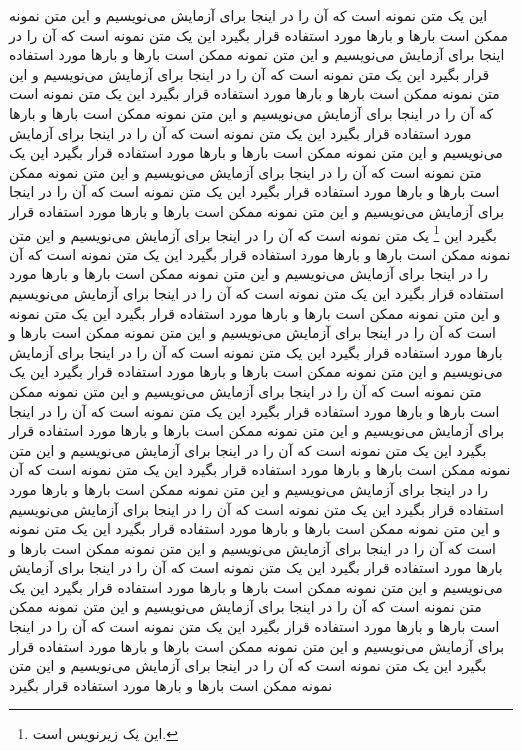\documentclass{article}
\begin{document}
\begin{multicols}{4}
این یک متن نمونه است که آن را در اینجا برای آزمایش می‌نویسیم و این متن نمونه ممکن است بارها و بارها مورد استفاده قرار بگیرد این یک متن نمونه است که آن را در اینجا برای آزمایش می‌نویسیم و این متن نمونه ممکن است %
%
بارها و بارها مورد استفاده قرار بگیرد این یک متن نمونه است که آن را در اینجا برای آزمایش می‌نویسیم و این متن نمونه ممکن است بارها و بارها مورد استفاده قرار بگیرد این یک متن نمونه است که آن را در اینجا برای آزمایش می‌نویسیم و این متن نمونه ممکن است بارها و بارها مورد استفاده قرار بگیرد این یک متن نمونه است که آن را در اینجا برای آزمایش می‌نویسیم و این متن نمونه ممکن است بارها و بارها مورد استفاده قرار بگیرد این یک متن نمونه است که آن را در اینجا برای آزمایش می‌نویسیم و این متن نمونه ممکن است بارها و بارها مورد استفاده قرار بگیرد این یک متن نمونه است که آن را در اینجا برای آزمایش می‌نویسیم و این متن نمونه ممکن است بارها و بارها مورد استفاده قرار بگیرد این%
\footnote{این یک زیرنویس است.}%
 یک متن نمونه است که آن را در اینجا برای آزمایش می‌نویسیم و این متن نمونه ممکن است بارها و بارها مورد استفاده قرار بگیرد این یک متن نمونه است که آن را در اینجا برای آزمایش می‌نویسیم و این متن نمونه ممکن است بارها و بارها مورد استفاده قرار بگیرد این یک متن نمونه است که آن را در اینجا برای آزمایش می‌نویسیم و این متن نمونه ممکن است بارها و بارها مورد استفاده قرار بگیرد این یک متن نمونه است که آن را در اینجا برای آزمایش می‌نویسیم و این متن نمونه ممکن است بارها و بارها مورد استفاده قرار بگیرد این یک متن نمونه است که آن را در اینجا برای آزمایش می‌نویسیم و این متن نمونه ممکن است بارها و بارها مورد استفاده قرار بگیرد این یک متن نمونه است که آن را در اینجا برای آزمایش می‌نویسیم و این متن نمونه ممکن است بارها و بارها مورد استفاده قرار بگیرد این یک متن نمونه است که آن را در اینجا برای آزمایش می‌نویسیم و این متن نمونه ممکن است بارها و بارها مورد استفاده قرار بگیرد این یک متن نمونه است که آن را در اینجا برای آزمایش می‌نویسیم و این متن نمونه ممکن است بارها و بارها مورد استفاده قرار بگیرد این یک متن نمونه است که آن را در اینجا برای آزمایش می‌نویسیم و این متن نمونه ممکن است بارها و بارها مورد استفاده قرار بگیرد این یک متن نمونه است که آن را در اینجا برای آزمایش می‌نویسیم و این متن نمونه ممکن است بارها و بارها مورد استفاده قرار بگیرد این یک متن نمونه است که آن را در اینجا برای آزمایش می‌نویسیم و این متن نمونه ممکن است بارها و بارها مورد استفاده قرار بگیرد این یک متن نمونه است که آن را در اینجا برای آزمایش می‌نویسیم و این متن نمونه ممکن است بارها و بارها مورد استفاده قرار بگیرد این یک متن نمونه است که آن را در اینجا برای آزمایش می‌نویسیم و این متن نمونه ممکن است بارها و بارها مورد استفاده قرار بگیرد این یک متن نمونه است که آن را در اینجا برای آزمایش می‌نویسیم و این متن نمونه ممکن است بارها و بارها مورد استفاده قرار بگیرد 
این یک متن نمونه است که آن را در اینجا برای آزمایش می‌نویسیم و این متن نمونه ممکن است بارها و بارها مورد استفاده قرار بگیرد 
\end{multicols}
\end{document}
